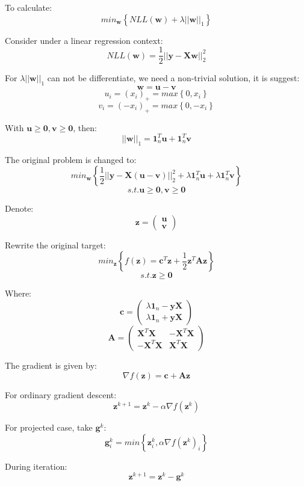 \documentclass[UTF8]{ctexart}
\begin{document}
To calculate:
$$min_{\textbf{w}}\left\{ NLL(\textbf{w}) +\lambda||\textbf{w}||_{1}\right\}$$

Consider under a linear regression context:
$$NLL(\textbf{w})=\frac{1}{2}||\textbf{y}-\textbf{X}\textbf{w}||^{2}_{2}$$

For $\lambda||\textbf{w}||_{1}$ can not be differentiate, we need a non-trivial solution, it is suggest:
$$\textbf{w}=\textbf{u}-\textbf{v}$$
$$u_{i}=(x_{i})_{+}=max \left\{ 0,x_{i} \right\}$$
$$v_{i}=(-x_{i})_{+}=max \left\{ 0,-x_{i} \right\}$$

With $\textbf{u} \geq \textbf{0},\textbf{v} \geq \textbf{0}$, then:
$$||\textbf{w}||_{1} = \textbf{1}_{n}^{T}\textbf{u} + \textbf{1}_{n}^{T}\textbf{v}$$

The original problem is changed to:
$$min_{\textbf{w}}\left\{ \frac{1}{2}||\textbf{y}-\textbf{X}(\textbf{u}-\textbf{v})||^{2}_{2} + \lambda\textbf{1}_{n}^{T}\textbf{u} + \lambda\textbf{1}_{n}^{T}\textbf{v} \right\}$$
$$s.t.\textbf{u} \geq \textbf{0},\textbf{v} \geq \textbf{0}$$

Denote:
$$\textbf{z} = \begin{pmatrix}  \textbf{u} \\ \textbf{v} \end{pmatrix}$$

Rewrite the original target:
$$min_{\textbf{z}}\left\{ f(\textbf{z}) = \textbf{c}^{T}\textbf{z} +\frac{1}{2}\textbf{z}^{T}\textbf{A}\textbf{z} \right\}$$
$$s.t.\textbf{z} \geq \textbf{0}$$

Where:
$$\textbf{c} = \begin{pmatrix} \lambda \textbf{1}_{n} - \textbf{y}\textbf{X} \\ \lambda\textbf{1}_{n} + \textbf{y}\textbf{X} \end{pmatrix}$$
$$\textbf{A}=\begin{pmatrix} \textbf{X}^{T}\textbf{X} & -\textbf{X}^{T}\textbf{X} \\ -\textbf{X}^{T}\textbf{X} & \textbf{X}^{T}\textbf{X} \end{pmatrix}$$

The gradient is given by:
$$\nabla f(\textbf{z})=\textbf{c}+\textbf{A}\textbf{z}$$

For ordinary gradient descent:
$$\textbf{z}^{k+1}=\textbf{z}^{k}-\alpha\nabla f(\textbf{z}^{k})$$

For projected case, take $\textbf{g}^{k}$:
$$\textbf{g}^{k}_{i}=min\left\{ \textbf{z}^{k}_{i},\alpha\nabla f(\textbf{z}^{k})_{i} \right\}$$

During iteration:
$$\textbf{z}^{k+1}=\textbf{z}^{k} - \textbf{g}^{k}$$
\end{document}
